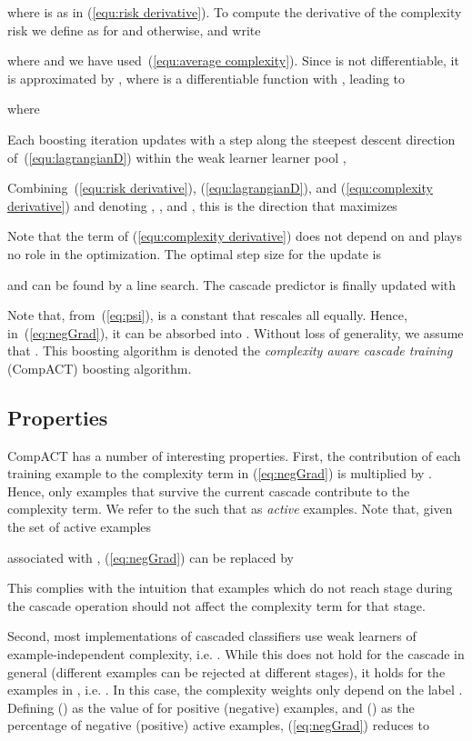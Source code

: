 \documentclass[10pt,twocolumn,letterpaper]{article}
\begin{document}
where  is as in (\ref{equ:risk derivative}).
To compute the derivative of the complexity risk we define  as  for  and  otherwise, and write

where  and we have used~(\ref{equ:average complexity}). Since   is not differentiable, it is approximated by
, where  is a
differentiable function with , leading to

where


Each boosting iteration updates  with a step along the steepest descent
direction of~(\ref{equ:lagrangianD}) within the weak learner learner pool
,

Combining~(\ref{equ:risk derivative}), (\ref{equ:lagrangianD}), and
(\ref{equ:complexity derivative}) and denoting ,
,  and ,
this is the direction that maximizes

Note that the term  of
(\ref{equ:complexity derivative}) does not depend on  and plays no
role in the optimization.
The optimal step size for the update is

and can be found by a line search. The cascade predictor is finally
updated with

Note that, from~(\ref{eq:psi}),   is a constant that rescales all  equally. Hence, in~(\ref{eq:negGrad}), it can be absorbed into . Without loss of generality, we assume that . This boosting algorithm is denoted the {\it complexity aware cascade training\/} (CompACT) boosting algorithm.






\subsection{Properties}

CompACT has a number of interesting properties. First, the contribution of each
training example to the complexity term in (\ref{eq:negGrad}) is multiplied by . Hence, only examples that survive the current cascade  contribute to
the complexity term. We refer to the  such that  as
{\it active\/} examples.  Note that, given the set of active examples

associated with , (\ref{eq:negGrad}) can be replaced by

This complies with the intuition that examples which do not reach stage  during the cascade operation should not affect the complexity term for that stage.

Second, most implementations of cascaded classifiers use weak learners of
example-independent complexity, i.e. .
While this does not hold for the cascade in general (different examples can
be rejected at different stages), it holds for the examples in ,
i.e. . In this case, the
complexity weights only depend on the label . Defining
 ()
as the value of  for positive (negative) examples, and
 () as the percentage of negative (positive) active
examples, (\ref{eq:negGrad}) reduces to
\end{document}
